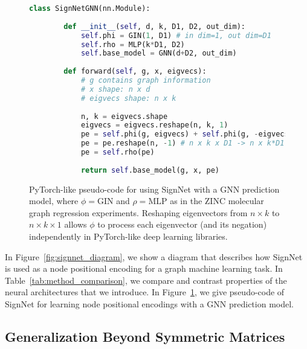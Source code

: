 \documentclass{article} \usepackage{iclr2023_conference,times}
\newcommand{\mrm}[1]{\mathrm{#1}}
\begin{document}
\begin{figure}[ht]
    \centering
    \begin{minipage}{.6\columnwidth}
    \begin{lstlisting}[language=python,
        title={PyTorch-like pseudo-code for SignNet},
        captionpos=t]
    class SignNetGNN(nn.Module):
    
        def __init__(self, d, k, D1, D2, out_dim):
            self.phi = GIN(1, D1) # in dim=1, out dim=D1
            self.rho = MLP(k*D1, D2)
            self.base_model = GNN(d+D2, out_dim)
            
        def forward(self, g, x, eigvecs):
            # g contains graph information
            # x shape: n x d
            # eigvecs shape: n x k
            
            n, k = eigvecs.shape
            eigvecs = eigvecs.reshape(n, k, 1)
            pe = self.phi(g, eigvecs) + self.phi(g, -eigvecs)
            pe = pe.reshape(n, -1) # n x k x D1 -> n x k*D1
            pe = self.rho(pe)
            
            return self.base_model(g, x, pe)
    \end{lstlisting}
    \end{minipage}
    \caption{PyTorch-like pseudo-code for using SignNet with a GNN prediction model, where $\phi=\mrm{GIN}$ and $\rho=\mrm{MLP}$ as in the ZINC molecular graph regression experiments. Reshaping eigenvectors from $n \times k$ to $n \times k \times 1$ allows $\phi$ to process each eigenvector (and its negation) independently in PyTorch-like deep learning libraries.}
    \label{fig:signnet_code}
\end{figure}

In Figure~\ref{fig:signnet_diagram}, we show a diagram that describes how SignNet is used as a node positional encoding for a graph machine learning task. In Table~\ref{tab:method_comparison}, we compare and contrast properties of the neural architectures that we introduce. In Figure~\ref{fig:signnet_code}, we give pseudo-code of SignNet for learning node positional encodings with a GNN prediction model.

\subsection{Generalization Beyond Symmetric Matrices}\label{appendix:nonsymmetric}
\end{document}
